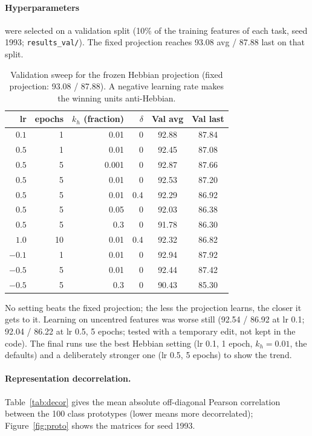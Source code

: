 \documentclass[11pt,a4paper]{article}
\begin{document}
\paragraph{Hyperparameters} were selected on a validation split (10\% of the training features of
each task, seed 1993; \texttt{results\_val/}). The fixed projection reaches 93.08 avg / 87.88 last
on that split.

\begin{table}[h]
\centering
\caption{Validation sweep for the frozen Hebbian projection (fixed projection: 93.08 / 87.88).
A negative learning rate makes the winning units anti-Hebbian.}
\label{tab:val1}
\small
\begin{tabular}{rrrrcc}
\toprule
lr & epochs & $k_h$ (fraction) & $\delta$ & Val avg & Val last \\
\midrule
$0.1$  & 1  & 0.01  & 0   & 92.88 & 87.84 \\
$0.5$  & 1  & 0.01  & 0   & 92.45 & 87.08 \\
$0.5$  & 5  & 0.001 & 0   & 92.87 & 87.66 \\
$0.5$  & 5  & 0.01  & 0   & 92.53 & 87.20 \\
$0.5$  & 5  & 0.01  & 0.4 & 92.29 & 86.92 \\
$0.5$  & 5  & 0.05  & 0   & 92.03 & 86.38 \\
$0.5$  & 5  & 0.3   & 0   & 91.78 & 86.30 \\
$1.0$  & 10 & 0.01  & 0.4 & 92.32 & 86.82 \\
$-0.1$ & 1  & 0.01  & 0   & 92.94 & 87.92 \\
$-0.5$ & 5  & 0.01  & 0   & 92.44 & 87.42 \\
$-0.5$ & 5  & 0.3   & 0   & 90.43 & 85.30 \\
\bottomrule
\end{tabular}
\end{table}

No setting beats the fixed projection; the less the projection learns, the closer it gets to it.
Learning on uncentred features was worse still (92.54 / 86.92 at lr 0.1; 92.04 / 86.22 at lr 0.5,
5 epochs; tested with a temporary edit, not kept in the code). The final runs use the best Hebbian
setting (lr 0.1, 1 epoch, $k_h = 0.01$, the defaults) and a deliberately stronger one (lr 0.5,
5 epochs) to show the trend.

\paragraph{Representation decorrelation.} Table~\ref{tab:decor} gives the mean absolute
off-diagonal Pearson correlation between the 100 class prototypes (lower means more decorrelated);
Figure~\ref{fig:proto} shows the matrices for seed 1993.
\end{document}
